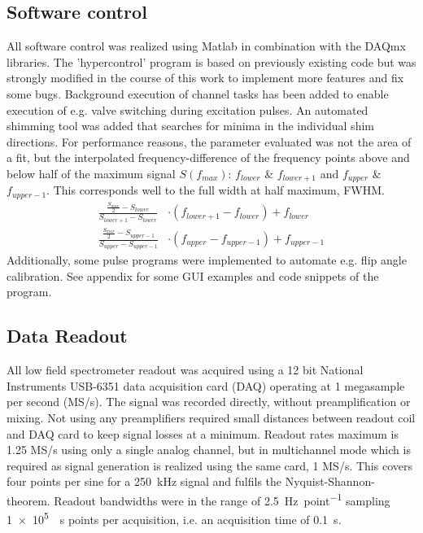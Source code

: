         \subsection{Software control}
        \label{sec:matMeth:hypercontrol}
        All software control was realized using Matlab in combination with the DAQmx libraries. The 'hypercontrol' program is based on previously existing code but was strongly modified in the course of this work to implement more features and fix some bugs. Background execution of channel tasks has been added to enable execution of e.g. valve switching during excitation pulses. An automated shimming tool was added that searches for minima in the individual shim directions. For performance reasons, the parameter evaluated was not the area of a fit, but the interpolated frequency-difference of the frequency points above and below half of the maximum signal $S(f_{max})$: $f_{lower}$ \& $f_{lower+1}$ and $f_{upper}$ \& $f_{upper-1}$. This corresponds well to the full width at half maximum, FWHM.
        \begin{equation}
            \begin{aligned}
                \frac{\frac{S_{max}}{2} - S_{lower}}{S_{lower+1} -S_{lower}}&\cdot (f_{lower + 1} -f_{lower}) + f_{lower}\\
                \frac{\frac{S_{max}}{2} - S_{upper -1}}{S_{upper} -S_{upper-1}}& \cdot (f_{upper} -f_{upper-1}) + f_{upper -1}
            \end{aligned}
        \end{equation}
            Additionally, some pulse programs were implemented to automate e.g. flip angle calibration. See appendix for some GUI examples and code snippets of the program.
        \subsection{Data Readout}
        All low field spectrometer readout was acquired using a 12 bit National Instruments USB-6351 data acquisition card (DAQ) operating at 1 megasample per second (MS/s). The signal was recorded directly, without preamplification or mixing. Not using any preamplifiers required small distances between readout coil and DAQ card to keep signal losses at a minimum. Readout rates maximum is 1.25 MS/s using only a single analog channel, but in multichannel mode which is required as signal generation is realized using the same card, 1 MS/s. This covers four points per sine for a \SI{250}{\kilo\hertz} signal and fulfils the Nyquist-Shannon-theorem. Readout bandwidths were in the range of \SI{2.5}{\hertz\per point} sampling \SI{1e5}{\per\second} points per acquisition, i.e. an acquisition time of \SI{0.1}{\second}.
